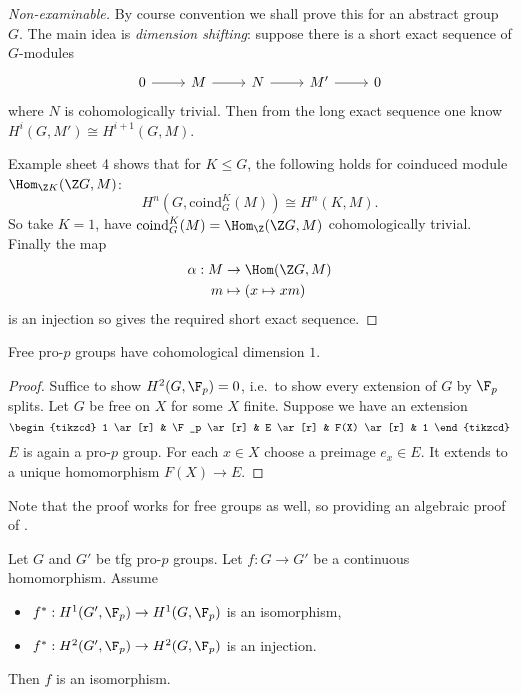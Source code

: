 \documentclass[a4paper]{article}
\begin{document}
\begin{proof}[Non-examinable]
  By course convention we shall prove this for an abstract group \(G\). The main idea is \emph{dimension shifting}: suppose there is a short exact sequence of \(G\)-modules
  \[
    \begin{tikzcd}
      0 \ar[r] & M \ar[r] & N \ar[r] & M' \ar[r] & 0
    \end{tikzcd}
  \]
  where \(N\) is cohomologically trivial. Then from the long exact sequence one know \(H^i(G, M') \cong H^{i + 1}(G, M)\).
  
  Example sheet 4 shows that for \(K \leq G\), the following holds for coinduced module \(\Hom_{\Z K}(\Z G, M)\):
  \[
    H^n(G, \mathrm{coind}^K_G(M)) \cong H^n(K, M).
  \]
  So take \(K = 1\), have \(\mathrm{coind}^K_G(M) = \Hom_\Z(\Z G, M)\) cohomologically trivial. Finally the map
  \begin{align*}
    \alpha: M &\to \Hom(\Z G, M) \\
    m &\mapsto (x \mapsto xm)
  \end{align*}
  is an injection so gives the required short exact sequence.
\end{proof}

\begin{corollary}
  Free pro-\(p\) groups have cohomological dimension \(1\).
\end{corollary}

\begin{proof}
  Suffice to show \(H^2(G, \F_p) = 0\), i.e.\ to show every extension of \(G\) by \(\F_p\) splits. Let \(G\) be free on \(X\) for some \(X\) finite. Suppose we have an extension
  \[
    \begin{tikzcd}
      1 \ar[r] & \F_p \ar[r] & E \ar[r] & F(X) \ar[r] & 1
    \end{tikzcd}
  \]
  \(E\) is again a pro-\(p\) group. For each \(x \in X\) choose a preimage \(e_x \in E\). It extends to a unique homomorphism \(F(X) \to E\).
\end{proof}

Note that the proof works for free groups as well, so providing an algebraic proof of .

\begin{theorem}
  Let \(G\) and \(G'\) be tfg pro-\(p\) groups. Let \(f: G \to G'\) be a continuous homomorphism. Assume
  \begin{itemize}
  \item \(f^*: H^1(G', \F_p) \to H^1(G, \F_p)\) is an isomorphism,
  \item \(f^*: H^2(G', \F_p) \to H^2(G, \F_p)\) is an injection.
  \end{itemize}
  Then \(f\) is an isomorphism.
\end{theorem}
\end{document}
